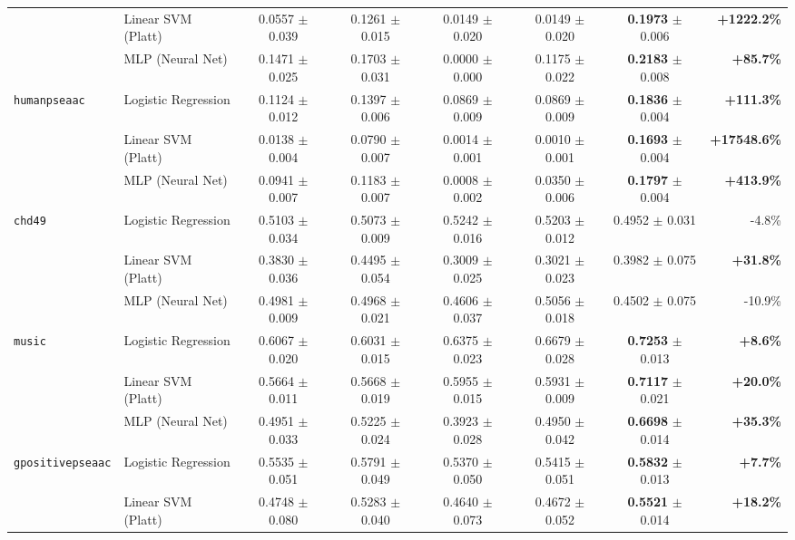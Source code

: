 \documentclass[10pt,a4paper,twoside]{article}
\begin{document}
\begin{table}[H]
{\begin{tabular}{llcccccr}
 & Linear SVM (Platt) & 0.0557 $\pm$ 0.039 & 0.1261 $\pm$ 0.015 & 0.0149 $\pm$ 0.020 & 0.0149 $\pm$ 0.020 & \textbf{0.1973} $\pm$ 0.006 & \textbf{+1222.2\%} \\
 & MLP (Neural Net) & 0.1471 $\pm$ 0.025 & 0.1703 $\pm$ 0.031 & 0.0000 $\pm$ 0.000 & 0.1175 $\pm$ 0.022 & \textbf{0.2183} $\pm$ 0.008 & \textbf{+85.7\%} \\
\midrule
\multirow{3}{*}{\texttt{humanpseaac}} & Logistic Regression & 0.1124 $\pm$ 0.012 & 0.1397 $\pm$ 0.006 & 0.0869 $\pm$ 0.009 & 0.0869 $\pm$ 0.009 & \textbf{0.1836} $\pm$ 0.004 & \textbf{+111.3\%} \\
 & Linear SVM (Platt) & 0.0138 $\pm$ 0.004 & 0.0790 $\pm$ 0.007 & 0.0014 $\pm$ 0.001 & 0.0010 $\pm$ 0.001 & \textbf{0.1693} $\pm$ 0.004 & \textbf{+17548.6\%} \\
 & MLP (Neural Net) & 0.0941 $\pm$ 0.007 & 0.1183 $\pm$ 0.007 & 0.0008 $\pm$ 0.002 & 0.0350 $\pm$ 0.006 & \textbf{0.1797} $\pm$ 0.004 & \textbf{+413.9\%} \\
\midrule
\multirow{3}{*}{\texttt{chd49}} & Logistic Regression & 0.5103 $\pm$ 0.034 & 0.5073 $\pm$ 0.009 & 0.5242 $\pm$ 0.016 & 0.5203 $\pm$ 0.012 & 0.4952 $\pm$ 0.031 & -4.8\% \\
 & Linear SVM (Platt) & 0.3830 $\pm$ 0.036 & 0.4495 $\pm$ 0.054 & 0.3009 $\pm$ 0.025 & 0.3021 $\pm$ 0.023 & 0.3982 $\pm$ 0.075 & \textbf{+31.8\%} \\
 & MLP (Neural Net) & 0.4981 $\pm$ 0.009 & 0.4968 $\pm$ 0.021 & 0.4606 $\pm$ 0.037 & 0.5056 $\pm$ 0.018 & 0.4502 $\pm$ 0.075 & -10.9\% \\
\midrule
\multirow{3}{*}{\texttt{music}} & Logistic Regression & 0.6067 $\pm$ 0.020 & 0.6031 $\pm$ 0.015 & 0.6375 $\pm$ 0.023 & 0.6679 $\pm$ 0.028 & \textbf{0.7253} $\pm$ 0.013 & \textbf{+8.6\%} \\
 & Linear SVM (Platt) & 0.5664 $\pm$ 0.011 & 0.5668 $\pm$ 0.019 & 0.5955 $\pm$ 0.015 & 0.5931 $\pm$ 0.009 & \textbf{0.7117} $\pm$ 0.021 & \textbf{+20.0\%} \\
 & MLP (Neural Net) & 0.4951 $\pm$ 0.033 & 0.5225 $\pm$ 0.024 & 0.3923 $\pm$ 0.028 & 0.4950 $\pm$ 0.042 & \textbf{0.6698} $\pm$ 0.014 & \textbf{+35.3\%} \\
\midrule
\multirow{3}{*}{\texttt{gpositivepseaac}} & Logistic Regression & 0.5535 $\pm$ 0.051 & 0.5791 $\pm$ 0.049 & 0.5370 $\pm$ 0.050 & 0.5415 $\pm$ 0.051 & \textbf{0.5832} $\pm$ 0.013 & \textbf{+7.7\%} \\
 & Linear SVM (Platt) & 0.4748 $\pm$ 0.080 & 0.5283 $\pm$ 0.040 & 0.4640 $\pm$ 0.073 & 0.4672 $\pm$ 0.052 & \textbf{0.5521} $\pm$ 0.014 & \textbf{+18.2\%} \\

\end{tabular}}
\end{table}
\end{document}
